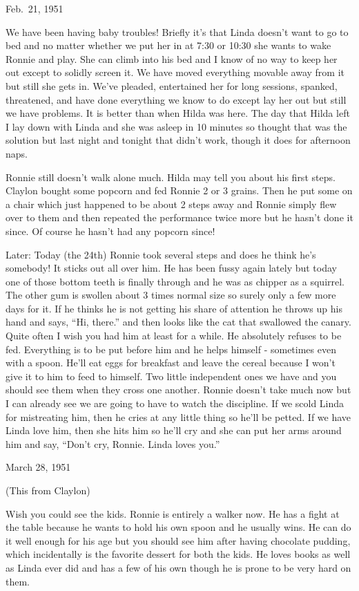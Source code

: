 \documentclass[]{book}
\begin{document}
Feb.~21, 1951

We have been having baby troubles! Briefly it's that Linda doesn't want to go to bed and no matter whether we put her in at 7:30 or 10:30 she wants to wake Ronnie and play. She can climb into his bed and I know of no way to keep her out except to solidly screen it. We have moved everything movable away from it but still she gets in. We've pleaded, entertained her for long sessions, spanked, threatened, and have done everything we know to do except lay her out but still we have problems. It is better than when Hilda was here. The day that Hilda left I lay down with Linda and she was asleep in 10 minutes so thought that was the solution but last night and tonight that didn't work, though it does for afternoon naps.

Ronnie still doesn't walk alone much. Hilda may tell you about his first steps. Claylon bought some popcorn and fed Ronnie 2 or 3 grains. Then he put some on a chair which just happened to be about 2 steps away and Ronnie simply flew over to them and then repeated the performance twice more but he hasn't done it since. Of course he hasn't had any popcorn since!

Later: Today (the 24th) Ronnie took several steps and does he think he's somebody! It sticks out all over him. He has been fussy again lately but today one of those bottom teeth is finally through and he was as chipper as a squirrel. The other gum is swollen about 3 times normal size so surely only a few more days for it. If he thinks he is not getting his share of attention he throws up his hand and says, ``Hi, there.'' and then looks like the cat that swallowed the canary. Quite often I wish you had him at least for a while. He absolutely refuses to be fed. Everything is to be put before him and he helps himself - sometimes even with a spoon. He'll eat eggs for breakfast and leave the cereal because I won't give it to him to feed to himself. Two little independent ones we have and you should see them when they cross one another. Ronnie doesn't take much now but I can already see we are going to have to watch the discipline. If we scold Linda for mistreating him, then he cries at any little thing so he'll be petted. If we have Linda love him, then she hits him so he'll cry and she can put her arms around him and say, ``Don't cry, Ronnie. Linda loves you.''

March 28, 1951

(This from Claylon)

Wish you could see the kids. Ronnie is entirely a walker now. He has a fight at the table because he wants to hold his own spoon and he usually wins. He can do it well enough for his age but you should see him after having chocolate pudding, which incidentally is the favorite dessert for both the kids. He loves books as well as Linda ever did and has a few of his own though he is prone to be very hard on them.
\end{document}
